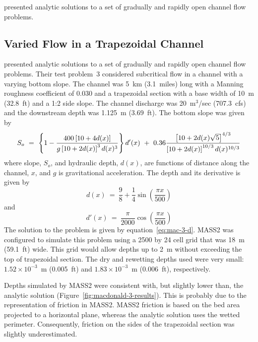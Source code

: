 \documentclass[12pt,dvips,letterpaper]{article}
\begin{document}
\cite{macdonald97:_analytic} presented analytic solutions to a set of
gradually and rapidly open channel flow problems.  




\subsection{Varied Flow in a Trapezoidal Channel}
\label{sec:grad-vari-flow}

\cite{macdonald97:_analytic} presented analytic solutions to a set of
gradually and rapidly open channel flow problems.  Their test
problem~3 considered subcritical flow in a channel with a varying
bottom slope.  The channel was 5~km (3.1~miles) long with a Manning
roughness coefficient of 0.030 and a trapezoidal section with a base
width of 10~m (32.8~ft) and a 1:2 side slope.  The channel discharge
was 20~m$^{3}$/sec (707.3~cfs) and the downstream depth was 1.125~m
(3.69~ft).  The bottom slope was given by
\begin{equation}
  S_{o} ~ = ~ \left\{ 1 - { { 400 \left[ 10 + 4d(x) \right] } \over { g
  \left[ 10 + 2d(x) \right]^{3} d(x)^{3} } } \right\} d'(x)
  ~ + ~ 0.36 { { \left[ 10 + 2d(x)\sqrt{5} \right]^{4 \slash 3} } \over {
  \left[ 10 + 2d(x) \right]^{10 \slash 3} d(x)^{10 \slash 3} } } \nonumber
\end{equation}
where slope, $S_{o}$, and hydraulic depth, $d(x)$, are functions of
distance along the channel, $x$, and $g$ is gravitational
acceleration.  The depth and its derivative is given by
\begin{equation}
  \label{eq:mac-3-d}
  d(x) ~ = ~ \frac{9}{8} + \frac{1}{4} \sin \left(\frac{\pi x}{500}\right)
\end{equation}
and
\begin{equation}
  d'(x) ~ = ~ \frac{\pi}{2000} \cos \left(\frac{\pi x}{500}\right) \nonumber
\end{equation}
The solution to the problem is given by equation~\ref{eq:mac-3-d}.
MASS2 was configured to simulate this problem using a 2500 by 24 cell
grid that was 18~m (59.1~ft) wide.  This grid would allow depths up to
2~m without exceeding the top of trapezoidal section. The dry and
rewetting depths used were very small: $1.52 \times 10^{-3}$~m
(0.005~ft) and $1.83 \times 10^{-3}$~m (0.006~ft), respectively.

Depths simulated by MASS2 were consistent with, but slightly lower
than, the analytic solution (Figure~\ref{fig:macdonald-3-results}).
This is probably due to the representation of friction in MASS2.
MASS2 friction is based on the bed area projected to a horizontal
plane, whereas the analytic solution uses the wetted perimeter.
Consequently, friction on the sides of the trapezoidal section was
slightly underestimated.
\end{document}
